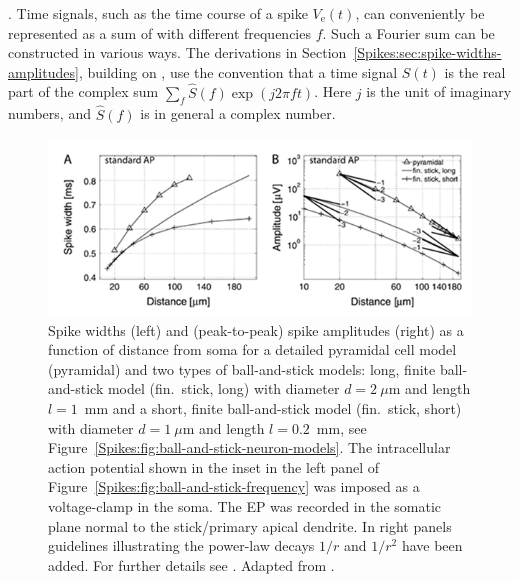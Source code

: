\subsubsection{}
.
Time signals, such as the time course of a spike $V_\mathrm{e}(t)$,  can conveniently 
be represented as a sum of  with different frequencies $f$. 
Such a Fourier sum can be constructed in
various ways. The derivations in 
Section~\ref{Spikes:sec:spike-widths-amplitudes}, building on \citet{Pettersen2008}, use the  
convention that a time signal $S(t)$ is the real part of the complex sum $\sum_{f}  \hat{S}(f) \exp (j 2 \pi f t)$. 
Here $j$ is the unit of imaginary numbers, and  $\hat{S}(f)$ is in general a complex number. 
%

\begin{figure}[!ht]
\begin{center}
\includegraphics{Figures/Spikes/Spikes-ball-and-stick-results-w100-r150}
\end{center}
\caption[]{
Spike widths (left) and (peak-to-peak) spike amplitudes (right) as a function of
distance from soma for a detailed pyramidal cell model (pyramidal) and two
types of ball-and-stick models: long, finite ball-and-stick
model (fin.~stick, long) with diameter $d=2~\mu$m and length
$l=1$~mm and a short, finite ball-and-stick model (fin.~stick, short) with diameter $d=1~\mu$m and length $l=0.2$~mm,
see Figure~\ref{Spikes:fig:ball-and-stick-neuron-models}.
The intracellular action potential shown in the inset in the left panel of 
Figure~\ref{Spikes:fig:ball-and-stick-frequency} was imposed as a voltage-clamp in the soma.
The EP was recorded in the
somatic plane normal to the stick/primary apical dendrite. 
In right panels guidelines illustrating the power-law decays $1/r$ and
$1/r^{2}$ have been added. 
For further details see \citet[Figure 6]{Pettersen2008}.
Adapted from \citet{Pettersen2008}.
}
\label{Spikes:fig:ball-and-stick-results}
\end{figure}

